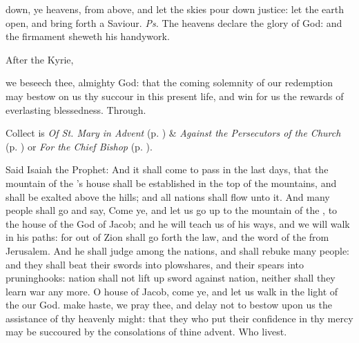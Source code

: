 

\properantiphonfix

\introit
{} down, ye heavens, from above, and let the skies pour down justice: let the earth open, and bring forth a Saviour. \textit{Ps.} The heavens declare the glory of God: and the firmament sheweth his handywork.
\begin{rubric}
    After the Kyrie,
\end{rubric}
\collect
{} we beseech thee, almighty God: that the coming solemnity of our redemption may bestow on us thy succour in this present life, and win for us the rewards of everlasting blessedness. Through.
\begin{rubric}
     Collect is \emph{Of St. Mary in Advent} (p. \pageref{SPMaryInAdvent}) \&  \emph{Against the Persecutors of the Church} (p. \pageref{SPAgainst}) or \emph{For the Chief Bishop} (p. \pageref{SPChiefBishop}).
\end{rubric}
 Said Isaiah the Prophet: And it shall come to pass in the last days, that the mountain of the 's house shall be established in the top of the mountains, and shall be exalted above the hills; and all nations shall flow unto it. And many people shall go and say, Come ye, and let us go up to the mountain of the , to the house of the God of Jacob; and he will teach us of his ways, and we will walk in his paths: for out of Zion shall go forth the law, and the word of the  from Jerusalem. And he shall judge among the nations, and shall rebuke many people: and they shall beat their swords into plowshares, and their spears into pruninghooks: nation shall not lift up sword against nation, neither shall they learn war any more. O house of Jacob, come ye, and let us walk in the light of the  our God. %
\collect
{} make haste, we pray thee, and delay not to bestow upon us the assistance of thy heavenly might: that they who put their confidence in thy mercy may be succoured by the consolations of thine advent. Who livest.

